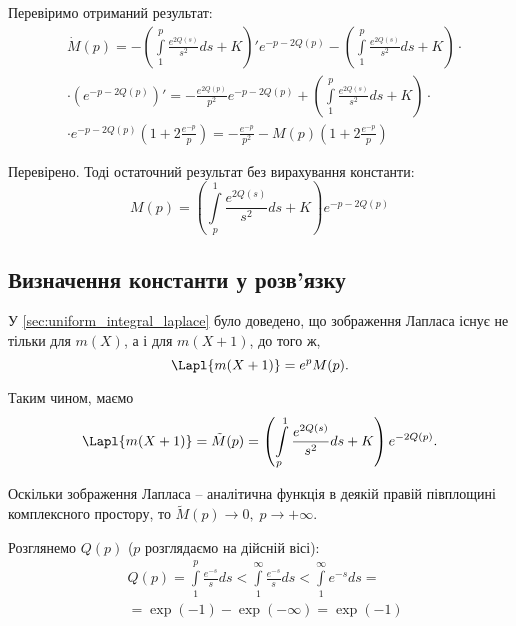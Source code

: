 Перевіримо отриманий результат:
\begin{equation*}
\begin{split}
	&\dot M(p) = -\left( \int\limits_1^p \frac{e^{2Q(s)}}{s^2} ds + K \right)' e^{- p - 2Q(p)} -\left( \int\limits_1^p \frac{e^{2Q(s)}}{s^2} ds + K \right)\cdot \\ 
	&\cdot \left(e^{- p - 2Q(p)}\right)' = -\frac{e^{2Q(p)}}{p^2} e^{- p - 2Q(p)}  + \left( \int\limits_1^p \frac{e^{2Q(s)}}{s^2} ds + K \right) \cdot \\
	& \cdot e^{- p - 2Q(p)} \left(1 + 2 \frac{e^{-p}}{p}\right) = -\frac{e^{-p}}{p^2} - M(p)\left(1 + 2 \frac{e^{-p}}{p}\right)
\end{split}
\end{equation*}

Перевірено. Тоді остаточний результат без вирахування константи:
\begin{equation}
	\label{eq:uniform_laplace_sol_initial}
	M(p)= \left( \int\limits_p^1 \frac{e^{2Q(s)}}{s^2} ds + K \right) e^{- p - 2Q(p)}
\end{equation}

\subsection{Визначення константи у розв'язку}

У \ref{sec:uniform_integral_laplace} було доведено, що зображення Лапласа існує не тільки для $m(X)$, а і для $m(X+1)$, до того ж,
\begin{equation}
	\Lapl{m(X+1)} = e^p M(p).
\end{equation}

Таким чином, маємо
\begin{equation}
	\Lapl{m(X+1)} =\tilde M(p)= \left( \int\limits_p^1 \frac{e^{2Q(s)}}{s^2} ds + K \right) e^{- 2Q(p)}.
\end{equation}

Оскільки зображення Лапласа – аналітична функція в деякій правій півплощині комплексного простору, то $\tilde M(p) \rightarrow 0,\; p \rightarrow +\infty$.

Розглянемо $Q(p)$ ($p$ розглядаємо на дійсній вісі):
\begin{equation}
\begin{split}
	&Q(p) = \int\limits_1^p \frac{e^{-s}}{s} ds <  \int\limits_1^\infty \frac{e^{-s}}{s} ds < 
	\int\limits_1^\infty e^{-s} ds=\\
	&= \exp(-1) - \exp(-\infty) = \exp(-1)
\end{split}
\end{equation}

